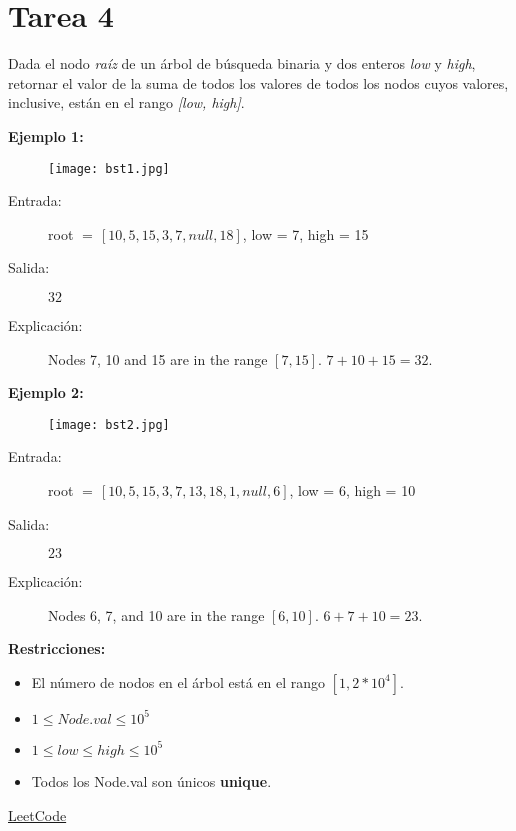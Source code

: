 \section{Tarea 4}
Dada el nodo \textit{raíz} de un árbol de búsqueda binaria y dos enteros \textit{low} y \textit{high}, retornar el valor de la suma de todos los valores de todos los nodos cuyos valores, inclusive, están en el rango \textit{[low, high]}.

\textbf{Ejemplo 1:}

\begin{figure}[H]
	\centering
	\texttt{[image: bst1.jpg]}
	\label{f1}
\end{figure}

\begin{description}
	\item[Entrada: ] root $=\, [10,5,15,3,7,null,18]$, low = 7, high = 15
	\item[Salida: ] $32$
	\item[Explicación: ] Nodes 7, 10 and 15 are in the range $[7,15]$. $7+10+15=32$.
\end{description}



\textbf{Ejemplo 2:}

\begin{figure}[H]
	\centering
	\texttt{[image: bst2.jpg]}
	\label{f2}
\end{figure}

\begin{description}
	\item[Entrada: ] root $=\, [10,5,15,3,7,13,18,1,null,6]$, low = 6, high = 10
	\item[Salida: ] $23$
	\item[Explicación: ] Nodes 6, 7, and 10 are in the range $[6, 10]$. $6 + 7 + 10 = 23$.
\end{description}

\textbf{Restricciones:}
\begin{itemize}
	\item El número de nodos en el árbol está en el rango $[1, 2 * 10^4]$.
	\item $1\leq Node.val \leq 10^5$
	\item $1 \leq low \leq high \leq 10^5$
	\item Todos los Node.val son únicos \textbf{unique}.
\end{itemize}

\href{https://leetcode.com/problems/range-sum-of-bst/}{LeetCode}





